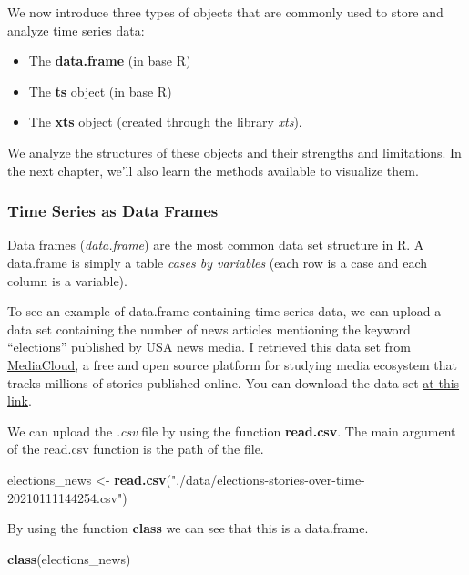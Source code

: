 \documentclass[
]{article}
\newenvironment{Shaded}{\begin{snugshade}}{\end{snugshade}}
\newcommand{\FunctionTok}[1]{\textcolor[rgb]{0.13,0.29,0.53}{\textbf{#1}}}
\newcommand{\NormalTok}[1]{#1}
\newcommand{\OtherTok}[1]{\textcolor[rgb]{0.56,0.35,0.01}{#1}}
\newcommand{\StringTok}[1]{\textcolor[rgb]{0.31,0.60,0.02}{#1}}
\providecommand{\tightlist}{%
  \setlength{\itemsep}{0pt}\setlength{\parskip}{0pt}}
\begin{document}
We now introduce three types of objects that are commonly used to store and analyze time series data:

\begin{itemize}
\tightlist
\item
  The \textbf{data.frame} (in base R)
\item
  The \textbf{ts} object (in base R)
\item
  The \textbf{xts} object (created through the library \emph{xts}).
\end{itemize}

We analyze the structures of these objects and their strengths and limitations. In the next chapter, we'll also learn the methods available to visualize them.

\subsubsection{Time Series as Data Frames}\label{time-series-as-data-frames}

Data frames (\emph{data.frame}) are the most common data set structure in R. A data.frame is simply a table \emph{cases by variables} (each row is a case and each column is a variable).

To see an example of data.frame containing time series data, we can upload a data set containing the number of news articles mentioning the keyword ``elections'' published by USA news media. I retrieved this data set from \href{https://mediacloud.org}{MediaCloud}, a free and open source platform for studying media ecosystem that tracks millions of stories published online. You can download the data set \href{https://drive.google.com/file/d/1vzpdPFb_ihBlqqbHxJS7mEvzQ3tNhmEm/view?usp=sharing}{at this link}.

We can upload the \emph{.csv} file by using the function \textbf{read.csv}. The main argument of the read.csv function is the path of the file.

\begin{Shaded}
\begin{Highlighting}[]
\NormalTok{elections\_news }\OtherTok{\textless{}{-}} \FunctionTok{read.csv}\NormalTok{(}\StringTok{"./data/elections{-}stories{-}over{-}time{-}20210111144254.csv"}\NormalTok{)}
\end{Highlighting}
\end{Shaded}

By using the function \textbf{class} we can see that this is a data.frame.

\begin{Shaded}
\begin{Highlighting}[]
\FunctionTok{class}\NormalTok{(elections\_news)}
\end{Highlighting}
\end{Shaded}
\end{document}
